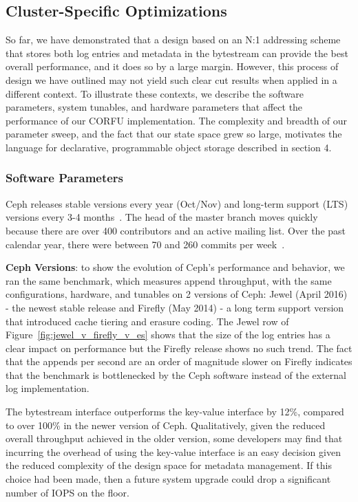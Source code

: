 \documentclass[10pt,twocolumn]{article}
\begin{document}
\subsection{Cluster-Specific Optimizations}

So far, we have demonstrated that a design based on an N:1 addressing scheme
that stores both log entries and metadata in the bytestream can provide the
best overall performance, and it does so by a large margin. However, this
process of design we have outlined may not yield such clear cut results when
applied in a different context. To illustrate these contexts, we describe the
software parameters, system tunables, and hardware parameters that affect the
performance of our CORFU implementation. The complexity and breadth of our
parameter sweep, and the fact that our state space grew so large, motivates the
language for declarative, programmable object storage described in section 4.

\subsubsection{Software Parameters}

Ceph releases stable versions every year (Oct/Nov) and long-term support (LTS)
versions every 3-4 months~\cite{website:ceph-releases}. The head of the master
branch moves quickly because there are over 400 contributors and an active
mailing list.  Over the past calendar year, there were between 70 and 260
commits per week~\cite{website:ceph-github}. 

\textbf{Ceph Versions}: to show the evolution of Ceph's performance and
behavior, we ran the same benchmark, which measures append throughput, with the
same configurations, hardware, and tunables on 2 versions of Ceph: Jewel (April
2016) - the newest stable release and Firefly (May 2014) - a long term support
version that introduced cache tiering and erasure coding. The Jewel row of 
Figure~\ref{fig:jewel_v_firefly_v_es} shows that the size of the log entries
has a clear impact on performance but the Firefly release shows no such trend.
The fact that the appends per second are an order of magnitude slower on
Firefly indicates that the benchmark is bottlenecked by the Ceph software
instead of the external log implementation. 

The bytestream interface outperforms the key-value interface by 12\%, compared
to over 100\% in the newer version of Ceph. Qualitatively, given the reduced
overall throughput achieved in the older version, some developers may find that
incurring the overhead of using the key-value interface is an easy decision
given the reduced complexity of the design space for metadata management. If
this choice had been made, then a future system upgrade could drop a
significant number of IOPS on the floor.
\end{document}
